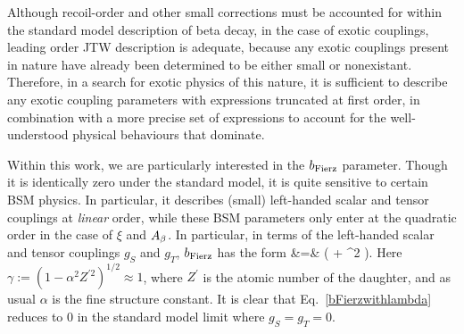Although recoil-order and other small corrections must be accounted for within the standard model description of beta decay, in the case of exotic couplings, leading order \ac{JTW} description is adequate, because any exotic couplings present in nature have already been determined to be either small or nonexistant.  Therefore, in a search for exotic physics of this nature, it is sufficient to describe any exotic coupling parameters with expressions truncated at first order, in combination with a more precise set of expressions to account for the well-understood physical behaviours that dominate.  

Within this work, we are particularly interested in the $b_{\mathrm{Fierz}}$ parameter.  Though it is identically zero under the standard model, it is quite sensitive to certain \ac{BSM} physics.  In particular, it describes (small) left-handed scalar and tensor couplings at \emph{linear} order, while these \ac{BSM} parameters only enter at the quadratic order in the case of $\xi$ and $A_{\beta}$.  In particular, in terms of the left-handed scalar and tensor couplings $g_S$ and $g_T$, $b_{\mathrm{Fierz}}$ has the form 
\bea
\bFierz &=&  \left(  + \rho^2  \right). 
\label{bFierzwithlambda}
\eea
Here $\gamma := \left( 1-\alpha^2 Z^{\prime 2} \right)^{1/2} \approx 1$, where $Z^\prime$ is the atomic number of the daughter, and as usual $\alpha$ is the fine structure constant. It is clear that Eq.~\ref{bFierzwithlambda} reduces to 0 in the standard model limit where $g_S = g_T = 0$.








